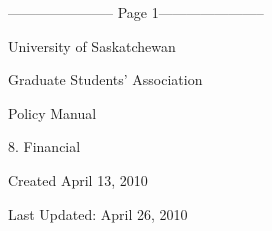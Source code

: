 ﻿----------------------- Page 1-----------------------

  

  

  

  

  

  

  

  

  

                                            University of Saskatchewan  

  

                                    Graduate Students’ Association  

  

  

  

  

  

  

  

  

  

  

  

  

  

  

  

  

  

  

  

  

  

  

  

                                                     Policy Manual  

  

                                                        8. Financial  

  

  

  

  

  

  

  

  

  

  

Created April 13, 2010  

  

Last Updated: April 26, 2010  



